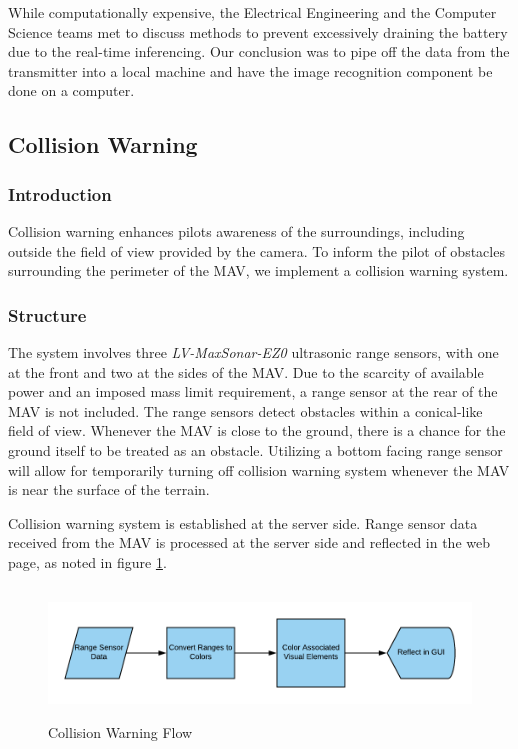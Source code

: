\documentclass[onecolumn, draftclsnofoot, 10pt, compsoc]{IEEEtran}
\begin{document}
While computationally expensive, the Electrical Engineering and the Computer Science teams met to discuss methods to prevent excessively draining the battery due to the real-time inferencing. Our conclusion was to pipe off the data from the transmitter into a local machine and have the image recognition component be done on a computer.


\subsection{Collision Warning}
\subsubsection{Introduction}
Collision warning enhances pilot\textquotesingle s awareness of the surroundings, including outside the field of view provided by the camera. To inform the pilot of obstacles surrounding the perimeter of the MAV, we implement a collision warning system.

\subsubsection{Structure}
The system involves three \textit{LV-MaxSonar-EZ0} ultrasonic range sensors, with one at the front and two at the sides of the MAV. Due to the scarcity of available power and an imposed mass limit requirement, a range sensor at the rear of the MAV is not included. The range sensors detect obstacles within a conical-like field of view. Whenever the MAV is close to the ground, there is a chance for the ground itself to be treated as an obstacle. Utilizing a bottom facing range sensor will allow for temporarily turning off collision warning system whenever the MAV is near the surface of the terrain.

Collision warning system is established at the server side. Range sensor data received from the MAV is processed at the server side and reflected in the web page, as noted in figure \ref{fig:ColWar}.
\begin{figure}[h]
    \centering
    \includegraphics[height=3.5cm]{graphics/collision_warning.png}
    \caption{Collision Warning Flow}
    \label{fig:ColWar}
\end{figure}
\end{document}
